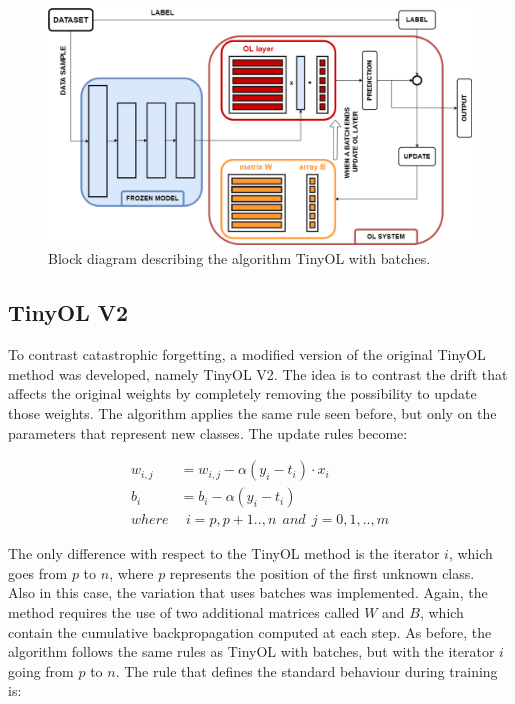 \documentclass[12pt]{report}
\begin{document}
\begin{figure}[h!]
    \centering
    \includegraphics[width=120mm]{Figures/Chapter3/OLwb.png} 
    \caption{Block diagram describing the algorithm TinyOL with batches.}
    \label{fig:block_diag_OLwb}    
\end{figure}

\subsection{TinyOL V2}
To contrast catastrophic forgetting, a modified version of the original TinyOL method was developed, namely TinyOL V2. The idea is to contrast the drift that affects the original weights by completely removing the possibility to update those weights. The algorithm applies the same rule seen before, but only on the parameters that represent new classes. The update rules become:

\begin{align}
	w_{i,j} &= w_{i,j} - \alpha (y_i - t_i) \cdot x_i \\
    b_i     &= b_i - \alpha (y_i - t_i) \\
    where   & \: \: i= p,p+1..,n  \: \: and \: \:  j=0,1,..,m \nonumber  
\end{align}

The only difference with respect to the TinyOL method is the iterator $i$, which goes from $p$ to $n$, where $p$ represents the position of the first unknown class. \\
Also in this case, the variation that uses batches was implemented. Again, the method requires the use of two additional matrices called $W$ and $B$, which contain the cumulative backpropagation computed at each step. As before, the algorithm follows the same rules as TinyOL with batches, but with the iterator $i$ going from $p$ to $n$. The rule that defines the standard behaviour during training is:
\end{document}
